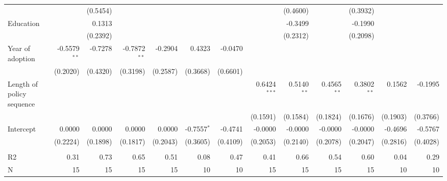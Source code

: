 \begin{tabular}{lrrrrrrrrrrrr}
                           &                  &        (0.5454) &                    &           &                &                &                   &        (0.4600) &                  &        (0.3932) &           &           \\
                 Education &                  &          0.1313 &                    &           &                &                &                   &         -0.3499 &                  &         -0.1990 &           &           \\
                           &                  &        (0.2392) &                    &           &                &                &                   &        (0.2312) &                  &        (0.2098) &           &           \\
          Year of adoption &  -0.5579$^{* *}$ &         -0.7278 &    -0.7872$^{* *}$ &   -0.2904 &         0.4323 &        -0.0470 &                   &                 &                  &                 &           &           \\
                           &         (0.2020) &        (0.4320) &           (0.3198) &  (0.2587) &       (0.3668) &       (0.6601) &                   &                 &                  &                 &           &           \\
 Length of policy sequence &                  &                 &                    &           &                &                &  0.6424$^{* * *}$ &  0.5140$^{* *}$ &   0.4565$^{* *}$ &  0.3802$^{* *}$ &    0.1562 &   -0.1995 \\
                           &                  &                 &                    &           &                &                &          (0.1591) &        (0.1584) &         (0.1824) &        (0.1676) &  (0.1903) &  (0.3766) \\
                 Intercept &           0.0000 &          0.0000 &             0.0000 &    0.0000 &  -0.7557$^{*}$ &        -0.4741 &           -0.0000 &         -0.0000 &          -0.0000 &         -0.0000 &   -0.4696 &   -0.5767 \\
                           &         (0.2224) &        (0.1898) &           (0.1817) &  (0.2043) &       (0.3605) &       (0.4109) &          (0.2053) &        (0.2140) &         (0.2078) &        (0.2047) &  (0.2816) &  (0.4028) \\
                           &                  &                 &                    &           &                &                &                   &                 &                  &                 &           &           \\
                        R2 &             0.31 &            0.73 &               0.65 &      0.51 &           0.08 &           0.47 &              0.41 &            0.66 &             0.54 &            0.60 &      0.04 &      0.29 \\
                         N &               15 &              15 &                 15 &        15 &             10 &             10 &                15 &              15 &               15 &              15 &        10 &        10 \\
\bottomrule
\end{tabular}
